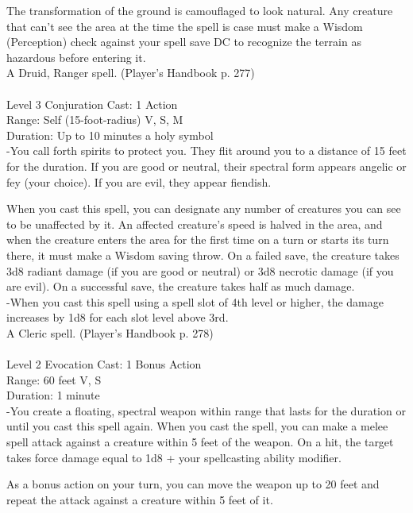 \documentclass[10pt,twocolumn]{report}
\begin{document}
The transformation of the ground is camouflaged to look natural. Any creature that can’t see the area at the time the spell is case must make a Wisdom (Perception) check against your spell save DC to recognize the terrain as hazardous before entering it.\\
A Druid, Ranger spell. (Player's Handbook p. 277) \\


 \\
Level 3 \quad Conjuration \quad Cast: 1 Action\\
Range: Self (15-foot-radius) \quad V, S, M\\
Duration: Up to 10 minutes \quad a holy symbol\\
-You call forth spirits to protect you.
They flit around you to a distance of 15 feet for the duration. If you are good or neutral, their spectral form appears angelic or fey (your choice). If you are evil, they appear fiendish.

When you cast this spell, you can designate any number of creatures you can see to be unaffected by it. An affected creature’s speed is halved in the area, and when the creature enters the area for the first time on a turn or starts its turn there, it must make a Wisdom saving throw. On a failed save, the creature takes 3d8 radiant damage (if you are good or neutral) or 3d8 necrotic damage (if you are evil). On a successful save, the creature takes half as much damage.\\
-When you cast this spell using a spell slot of 4th level or higher, the damage increases by 1d8 for each slot level above 3rd.\\
A Cleric spell. (Player's Handbook p. 278) \\


 \\
Level 2 \quad Evocation \quad Cast: 1 Bonus Action\\
Range: 60 feet \quad V, S\\
Duration: 1 minute \quad \\
-You create a floating, spectral weapon within range that lasts for the duration or until you cast this spell again.
When you cast the spell, you can make a melee spell attack against a creature within 5 feet of the weapon. On a hit, the target takes force damage equal to 1d8 + your spellcasting ability modifier.

As a bonus action on your turn, you can move the weapon up to 20 feet and repeat the attack against a creature within 5 feet of it.
\end{document}
